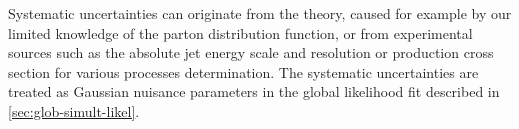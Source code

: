 Systematic uncertainties can originate from the theory, caused for example by
our limited knowledge of the parton distribution function, or from experimental
sources such as the absolute jet energy scale and resolution or production cross
section for various processes determination. The systematic uncertainties are
treated as Gaussian nuisance parameters in the global likelihood fit described
in \cref{sec:glob-simult-likel}.
